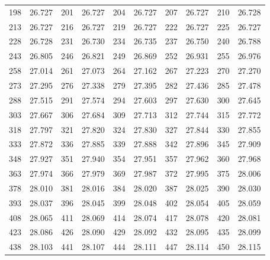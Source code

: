 \documentclass[12pt]{ctexart}
\numberwithin{equation}{section}
\begin{document}
\begin{longtable}{cc|cc|cc|cc|cc}
    198      & 26.727   & 201      & 26.727   & 204      & 26.727   & 207      & 26.727   & 210      & 26.728   \\
    213      & 26.727   & 216      & 26.727   & 219      & 26.727   & 222      & 26.727   & 225      & 26.727   \\
    228      & 26.728   & 231      & 26.730   & 234      & 26.735   & 237      & 26.750   & 240      & 26.788   \\
    243      & 26.805   & 246      & 26.821   & 249      & 26.869   & 252      & 26.931   & 255      & 26.976   \\
    258      & 27.014   & 261      & 27.073   & 264      & 27.162   & 267      & 27.223   & 270      & 27.270   \\
    273      & 27.295   & 276      & 27.338   & 279      & 27.395   & 282      & 27.436   & 285      & 27.478   \\
    288      & 27.515   & 291      & 27.574   & 294      & 27.603   & 297      & 27.630   & 300      & 27.645   \\
    303      & 27.667   & 306      & 27.684   & 309      & 27.713   & 312      & 27.744   & 315      & 27.772   \\
    318      & 27.797   & 321      & 27.820   & 324      & 27.830   & 327      & 27.844   & 330      & 27.855   \\
    333      & 27.872   & 336      & 27.885   & 339      & 27.888   & 342      & 27.896   & 345      & 27.909   \\
    348      & 27.927   & 351      & 27.940   & 354      & 27.951   & 357      & 27.962   & 360      & 27.968   \\
    363      & 27.974   & 366      & 27.979   & 369      & 27.987   & 372      & 27.995   & 375      & 28.006   \\
    378      & 28.010   & 381      & 28.016   & 384      & 28.020   & 387      & 28.025   & 390      & 28.030   \\
    393      & 28.037   & 396      & 28.045   & 399      & 28.048   & 402      & 28.054   & 405      & 28.059   \\
    408      & 28.065   & 411      & 28.069   & 414      & 28.074   & 417      & 28.078   & 420      & 28.081   \\
    423      & 28.086   & 426      & 28.090   & 429      & 28.092   & 432      & 28.095   & 435      & 28.099   \\
    438      & 28.103   & 441      & 28.107   & 444      & 28.111   & 447      & 28.114   & 450      & 28.115   \\

\end{longtable}
\end{document}

